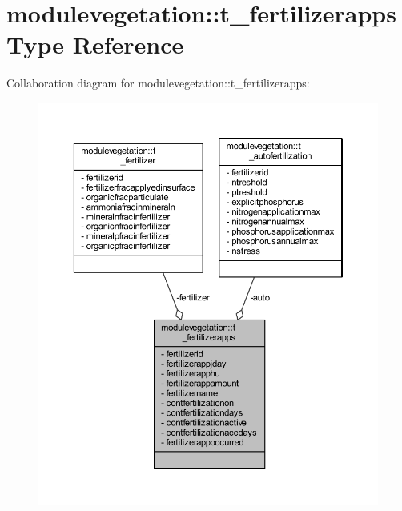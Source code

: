 \hypertarget{structmodulevegetation_1_1t__fertilizerapps}{}\section{modulevegetation\+:\+:t\+\_\+fertilizerapps Type Reference}
\label{structmodulevegetation_1_1t__fertilizerapps}


Collaboration diagram for modulevegetation\+:\+:t\+\_\+fertilizerapps\+:\nopagebreak
\begin{figure}[H]
\begin{center}
\leavevmode
\includegraphics[width=350pt]{structmodulevegetation_1_1t__fertilizerapps__coll__graph}
\end{center}
\end{figure}
